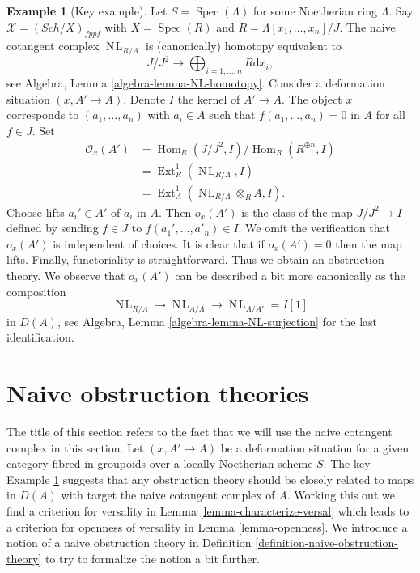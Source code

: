 \documentclass{stacks-project}
\theoremstyle{plain}
\theoremstyle{definition}
\newtheorem{example}[subsection]{Example}
\theoremstyle{remark}
\numberwithin{equation}{subsection}
\def\Spec{\mathop{\mathrm{Spec}}}
\def\Hom{\mathop{\mathrm{Hom}}\nolimits}
\def\Ext{\mathop{\mathrm{Ext}}\nolimits}
\def\Sch{\mathit{Sch}}
\def\NL{\mathop{N\!L}\nolimits}
\begin{document}
\begin{example}[Key example]
\label{example-key}
Let $S = \Spec(\Lambda)$ for some Noetherian ring $\Lambda$.
Say $\mathcal{X} = (\Sch/X)_{fppf}$ with $X = \Spec(R)$ and
$R = \Lambda[x_1, \ldots, x_n]/J$. The naive cotangent
complex $\NL_{R/\Lambda}$ is (canonically) homotopy equivalent to
$$
J/J^2
\longrightarrow
\bigoplus\nolimits_{i = 1, \ldots, n} R\text{d}x_i,
$$
see Algebra, Lemma \ref{algebra-lemma-NL-homotopy}.
Consider a deformation situation $(x, A' \to A)$. Denote $I$ the kernel of
$A' \to A$. The object $x$ corresponds to $(a_1, \ldots, a_n)$
with $a_i \in A$ such that $f(a_1, \ldots, a_n) = 0$ in $A$ for all $f \in J$.
Set
\begin{align*}
\mathcal{O}_x(A')
& =
\Hom_R(J/J^2, I)/\Hom_R(R^{\oplus n}, I) \\
& =
\Ext^1_R(\NL_{R/\Lambda}, I) \\
& =
\Ext^1_A(\NL_{R/\Lambda} \otimes_R A, I).
\end{align*}
Choose lifts $a_i' \in A'$ of $a_i$ in $A$. Then $o_x(A')$
is the class of the map $J/J^2 \to I$ defined by sending $f \in J$ to
$f(a_1', \ldots, a'_n) \in I$. We omit the verification that
$o_x(A')$ is independent of choices. It is clear that if $o_x(A') = 0$
then the map lifts. Finally, functoriality is straightforward.
Thus we obtain an obstruction theory. We observe that $o_x(A')$
can be described a bit more canonically as the composition
$$
\NL_{R/\Lambda} \to \NL_{A/\Lambda} \to \NL_{A/A'} = I[1]
$$
in $D(A)$, see Algebra, Lemma \ref{algebra-lemma-NL-surjection}
for the last identification.
\end{example}









\section{Naive obstruction theories}
\label{section-naive-obstruction-theory}

\noindent
The title of this section refers to the fact that we will use the
naive cotangent complex in this section. Let $(x, A' \to A)$
be a deformation situation for a given category fibred in groupoids over a
locally Noetherian scheme $S$. The key Example \ref{example-key}
suggests that any obstruction theory should be closely related to
maps in $D(A)$ with target the naive cotangent complex of $A$.
Working this out we find a criterion for versality in
Lemma \ref{lemma-characterize-versal} which leads to a criterion for
openness of versality in Lemma \ref{lemma-openness}. We introduce a notion of
a naive obstruction theory in
Definition \ref{definition-naive-obstruction-theory} to try to formalize
the notion a bit further.
\end{document}

